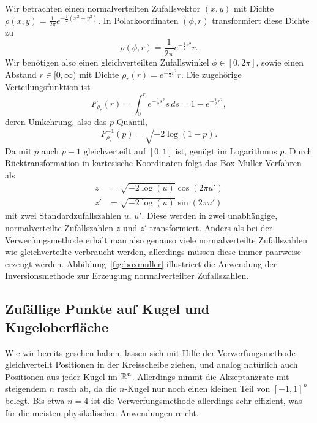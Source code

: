 Wir betrachten einen normalverteilten Zufallsvektor $(x, y)$ mit
Dichte $\rho(x, y) = \frac{1}{2\pi}e^{-\frac{1}{2}(x^2 + y^2)}$. In
Polarkoordinaten $(\phi,r)$ transformiert diese Dichte zu
\begin{equation}
  \rho(\phi, r) = \frac{1}{2\pi}e^{-\frac{1}{2}r^2} r.
\end{equation}
Wir benötigen also einen gleichverteilten Zufallswinkel $\phi\in
[0,2\pi]$, sowie einen Abstand $r\in [0,\infty)$ mit Dichte $\rho_r(r)
= e^{-\frac{1}{2}r^2} r$. Die zugehörige Verteilungsfunktion ist
\begin{equation}
  F_{\rho_r}(r) = \int_0^r e^{-\frac{1}{2}s^2} s\, ds = 1 - e^{-\frac{1}{2}r^2},
\end{equation}
deren Umkehrung, also das $p$-Quantil,
\begin{equation}
  \label{eq:expquantil}
  F_{\rho_r}^{-1}(p) = \sqrt{-2\log(1 - p)}.
\end{equation}
Da mit $p$ auch $p-1$ gleichverteilt auf $[0,1]$ ist, genügt im
Logarithmus $p$. Durch Rücktransformation in kartesische Koordinaten
folgt das Box-Muller-Verfahren als
\begin{align}
  z  &= \sqrt{-2\log(u)}\cos(2\pi u')\\
  z' &= \sqrt{-2\log(u)}\sin(2\pi u')
\end{align}
mit zwei Standardzufallszahlen $u$, $u'$. Diese werden in zwei
unabhängige, normalverteilte Zufallszahlen $z$ und $z'$
transformiert. Anders als bei der Verwerfungsmethode erhält man also
genauso viele normalverteilte Zufallszahlen wie gleichverteilte
verbraucht werden, allerdings müssen diese immer paarweise erzeugt
werden. Abbildung~\ref{fig:boxmuller} illustriert die Anwendung der
Inversionsmethode zur Erzeugung normalverteilter Zufallszahlen.

\subsection{Zufällige Punkte auf Kugel und Kugeloberfläche}

Wie wir bereits gesehen haben, lassen sich mit Hilfe der
Verwerfungsmethode gleichverteilt Positionen in der Kreisscheibe
ziehen, und analog natürlich auch Positionen aus jeder Kugel im
$\mathbb{R}^n$. Allerdings nimmt die Akzeptanzrate mit steigendem $n$ rasch
ab, da die $n$-Kugel nur noch einen kleinen Teil von $[-1,1]^n$
belegt. Bis etwa $n=4$ ist die Verwerfungsmethode allerdings sehr
effizient, was für die meisten physikalischen Anwendungen reicht.

